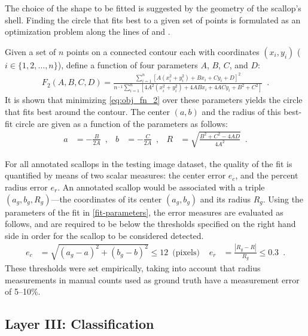 \documentclass {udthesis}
\begin{document}
The choice of the
shape to be fitted is suggested by the geometry of the scallop's shell.
Finding the circle that fits best to a given set of points is formulated as
an optimization problem along the lines of \cite{taubin}
and \cite{chernov}.

Given a set of $n$ points on a connected contour each with coordinates $(x_i,y_i)$ ($i\in\{1,2,\ldots,n\}$), 
define a  function of four parameters $A$, $B$, $C$, and $D$:
\begin{align} \label{eq:obj_fn_2}
 F_2(A,B,C,D) = \frac{\sum_{i=1}^{n} [A(x_i^2+y_i^2)+Bx_i+Cy_i+D]^2}{n^{-1}\sum_{i=1}^{n} [4A^2(x_i^2+y_i^2)+4ABx_i+4ACy_i+B^2+C^2]} \enspace.
\end{align}
It is shown \cite{taubin} that minimizing \eqref{eq:obj_fn_2} over these parameters yields the circle that fits best around the contour.
The center $(a,b)$ and the radius of this best-fit circle are given as a function of
the parameters as follows:
%
\begin{align} \label{fit-parameters}
a&=-\frac{B}{2A}\enspace,&  b&=-\frac{C}{2A} \enspace, &
R&=\sqrt{\frac{B^2+C^2-4AD}{4A^2}}  \enspace.
\end{align} 

For all annotated scallops in the testing image dataset, the quality of the fit is quantified by means of two scalar measures:
the center error $e_c$, and the percent radius error $e_r$.
An annotated scallop would be associated with a triple 
$(a_g, b_g,R_g)$---the coordinates of its center $(a_g,b_g)$ and its radius $R_g$.
Using the parameters of the fit in \eqref{fit-parameters}, the error measures are evaluated as follows, and are required to be below the thresholds specified on the right hand side in order for the scallop to be considered detected.
%
\begin{align*}	%
      e_c &= \sqrt{(a_g-a)^2 + (b_g-b)^2}\leq12 \enspace  \text{(pixels) } & 
      e_r &= \frac{| R_g - R |}{R_g} \leq0.3   \enspace.
\end{align*}
%
These thresholds were
set empirically, taking into account that radius measurements
in manual counts  used as ground truth \cite{walker} have a measurement error of 5--10\%. 



\subsection{Layer III: Classification} \label{subsec:layer3}
\end{document}
